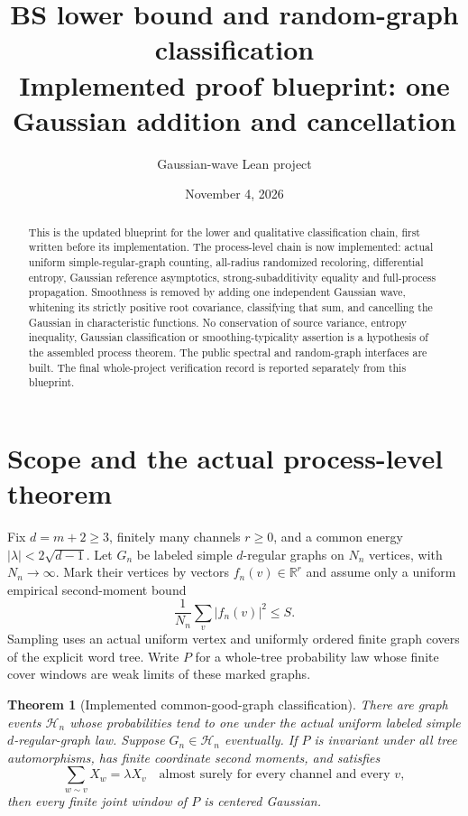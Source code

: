 \documentclass[11pt]{article}
\title{\textbf{BS lower bound and random-graph classification}\\[4pt]
\large Implemented proof blueprint: one Gaussian addition and cancellation}
\author{Gaussian-wave Lean project}
\date{November 4, 2026}
\newcommand{\R}{\mathbb R}
\newtheorem{theorem}{Theorem}
\begin{document}
\maketitle
\begin{abstract}
This is the updated blueprint for the lower and qualitative classification
chain, first written before its implementation. The process-level chain is
now implemented: actual uniform simple-regular-graph counting, all-radius
randomized recoloring, differential entropy, Gaussian reference asymptotics,
strong-subadditivity equality and full-process propagation. Smoothness is
removed by adding one independent Gaussian wave, whitening its strictly
positive root covariance, classifying that sum, and cancelling the Gaussian
in characteristic functions. No conservation of source variance, entropy
inequality, Gaussian classification or smoothing-typicality assertion is a
hypothesis of the assembled process theorem. The public spectral and random-graph interfaces are built. The final
whole-project verification record is reported separately from this blueprint.
\end{abstract}

\section{Scope and the actual process-level theorem}
Fix $d=m+2\geq3$, finitely many channels $r\geq0$, and a common energy
$|\lambda|<2\sqrt{d-1}$. Let $G_n$ be labeled simple $d$-regular graphs on
$N_n$ vertices, with $N_n\to\infty$. Mark their vertices by vectors
$f_n(v)\in\R^r$ and assume only a uniform empirical second-moment bound
\[
 \frac1{N_n}\sum_v|f_n(v)|^2\leq S.
\]
Sampling uses an actual uniform vertex and uniformly ordered finite graph
covers of the explicit word tree. Write $P$ for a whole-tree probability
law whose finite cover windows are weak limits of these marked graphs.

\begin{theorem}[Implemented common-good-graph classification]
There are graph events $\mathcal H_n$ whose probabilities tend to one under
the actual uniform labeled simple $d$-regular-graph law. Suppose
$G_n\in\mathcal H_n$ eventually. If $P$ is invariant under all tree
automorphisms, has finite coordinate second moments, and satisfies
\[
 \sum_{w\sim v}X_w=\lambda X_v
 \quad\text{almost surely for every channel and every }v,
\]
then every finite joint window of $P$ is centered Gaussian.
\end{theorem}
\end{document}
